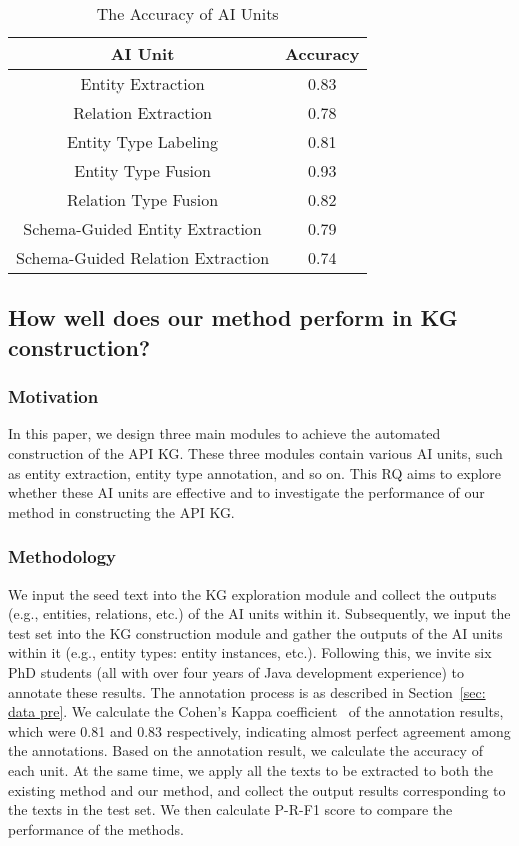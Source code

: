 \begin{table}[t]
\centering
\caption{The Accuracy of AI Units}
\label{tab: rq21res}
\begin{tabular}{c|c}
\hline
AI Unit                           & Accuracy \\ \hline
Entity Extraction                 & 0.83 \\ \hline
Relation Extraction               & 0.78 \\ \hline
Entity Type Labeling              & 0.81 \\ \hline
Entity Type Fusion                & 0.93 \\ \hline
Relation Type Fusion              & 0.82 \\ \hline
Schema-Guided Entity Extraction   & 0.79 \\ \hline
Schema-Guided Relation Extraction & 0.74 \\ \hline
\end{tabular}
\vspace{-4mm}
\end{table}

\subsection{How well does our method perform in KG construction?}\label{sec: RQ2}
\subsubsection{Motivation}
In this paper, we design three main modules to achieve the automated construction of the API KG.
These three modules contain various AI units, such as entity extraction, entity type annotation, and so on.
This RQ aims to explore whether these AI units are effective and to investigate the performance of our method in constructing the API KG.

\subsubsection{Methodology}
We input the seed text into the KG exploration module and collect the outputs (e.g., entities, relations, etc.) of the AI units within it.
Subsequently, we input the test set into the KG construction module and gather the outputs of the AI units within it (e.g., entity types: entity instances, etc.).
Following this, we invite six PhD students (all with over four years of Java development experience) to annotate these results.
The annotation process is as described in Section~\ref{sec: data pre}.
We calculate the Cohen's Kappa coefficient~\cite{Cohen1960ACO} of the annotation results, which were 0.81 and 0.83 respectively, indicating almost perfect agreement among the annotations.
Based on the annotation result, we calculate the accuracy of each unit.
At the same time, we apply all the texts to be extracted to both the existing method and our method, and collect the output results corresponding to the texts in the test set.
We then calculate P-R-F1 score to compare the performance of the methods.

